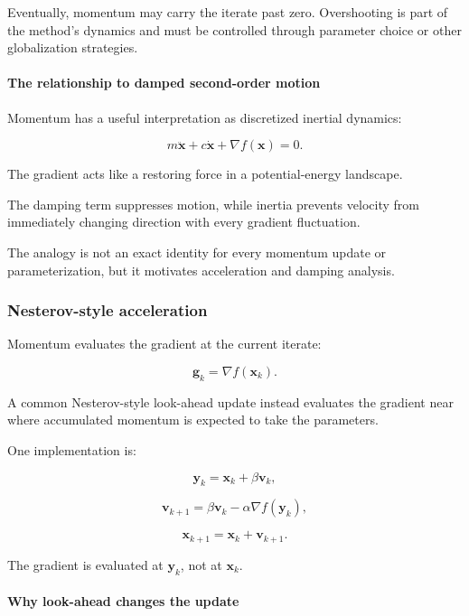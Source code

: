 Eventually, momentum may carry the iterate past zero. Overshooting is part of the method's dynamics and must be controlled through parameter choice or other globalization strategies.

\paragraph{The relationship to damped second-order motion}\label{02-foundations-ii-ch026-the-relationship-to-damped-second-order-motion}

Momentum has a useful interpretation as discretized inertial dynamics:

\[
m\ddot{\mathbf x} +c\dot{\mathbf x} +\nabla f(\mathbf x)=0.
\]

The gradient acts like a restoring force in a potential-energy landscape.

The damping term suppresses motion, while inertia prevents velocity from immediately changing direction with every gradient fluctuation.

The analogy is not an exact identity for every momentum update or parameterization, but it motivates acceleration and damping analysis.

\subsubsection{Nesterov-style acceleration}\label{02-foundations-ii-ch026-nesterov-style-acceleration}

Momentum evaluates the gradient at the current iterate:

\[
\mathbf g_k=\nabla f(\mathbf x_k).
\]

A common Nesterov-style look-ahead update instead evaluates the gradient near where accumulated momentum is expected to take the parameters.

One implementation is:

\[
\mathbf y_k=\mathbf x_k+\beta\mathbf v_k,
\]

\[
\mathbf v_{k+1} = \beta\mathbf v_k-\alpha\nabla f(\mathbf y_k),
\]

\[
\mathbf x_{k+1}=\mathbf x_k+\mathbf v_{k+1}.
\]

The gradient is evaluated at \(\mathbf y_k\), not at \(\mathbf x_k\).

\paragraph{Why look-ahead changes the update}\label{02-foundations-ii-ch026-why-look-ahead-changes-the-update}

